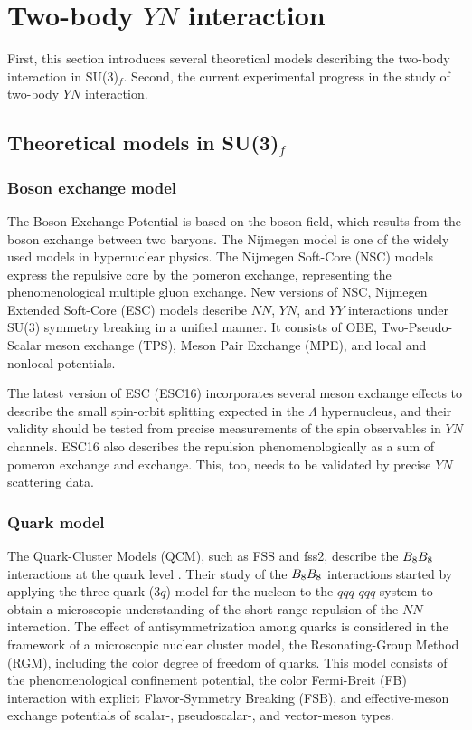\clearpage
\section{Two-body $YN$ interaction} 
\label{sec-YNint}

First, this section introduces several theoretical models describing the two-body interaction in SU(3)$_f$. Second, the current experimental progress in the study of two-body $YN$ interaction.
\subsection{Theoretical models in SU(3)$_f$}
\subsubsection{Boson exchange model}
The Boson Exchange Potential is based on the boson field, which results from the boson exchange between two baryons. The Nijmegen model is one of the widely used models in hypernuclear physics. The Nijmegen Soft-Core (NSC) models express the repulsive core by the pomeron exchange, representing the phenomenological multiple gluon exchange. New versions of NSC, Nijmegen Extended Soft-Core (ESC) models describe $NN$, $YN$, and $YY$ interactions under SU(3) symmetry breaking in a unified manner. It consists of OBE, Two-Pseudo-Scalar meson exchange (TPS), Meson Pair Exchange (MPE), and local and nonlocal potentials.

The latest version of ESC (ESC16) \cite{ESC16} incorporates several meson exchange effects to describe the small spin-orbit splitting expected in the $\Lambda$ hypernucleus, and their validity should be tested from precise measurements of the spin observables in $YN$ channels. ESC16 also describes the repulsion phenomenologically as a sum of  pomeron exchange and  exchange. This, too, needs to be validated by precise $YN$ scattering data.

\subsubsection{Quark model}
The Quark-Cluster Models (QCM), such as FSS and fss2, describe the $B_{8}B_{8}$ interactions at the quark level \cite{Fujiwara-2007}. Their study of the $B_{8}B_{8}$ interactions started by applying the three-quark ($3q$) model for the nucleon to the $qqq$-$qqq$ system to obtain a microscopic understanding of the short-range repulsion of the $NN$ interaction. The effect of antisymmetrization among quarks is considered in the framework of a microscopic nuclear cluster model, the Resonating-Group Method (RGM), including the color degree of freedom of quarks. This model consists of the phenomenological confinement potential, the color Fermi-Breit (FB) interaction with explicit Flavor-Symmetry Breaking (FSB), and effective-meson exchange potentials of scalar-, pseudoscalar-, and vector-meson types. 

